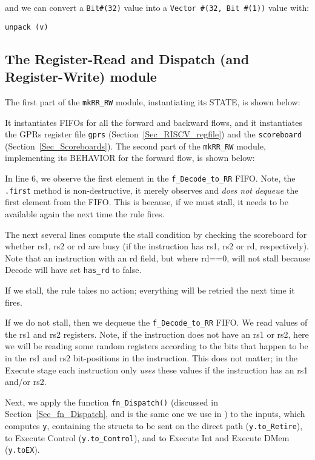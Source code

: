 and we can convert a \verb|Bit#(32)| value into a \verb|Vector #(32, Bit #(1))| value with:

\hmm \verb|unpack (v)|


\subsection{The Register-Read and Dispatch (and Register-Write) module}

\label{Sec_mkRR_RW}

The first part of the \verb|mkRR_RW| module, instantiating its STATE, is shown below:


It instantiates FIFOs for all the forward and backward flows, and it
instantiates the GPRs register file \verb|gprs|
(Section~\ref{Sec_RISCV_regfile}) and the \verb|scoreboard|
(Section~\ref{Sec_Scoreboards}).  The second part of the
\verb|mkRR_RW| module, implementing its BEHAVIOR for the forward flow,
is shown below:


In line 6, we observe the first element in the \verb|f_Decode_to_RR|
FIFO.  Note, the \verb|.first| method is non-destructive, {\ie} it
merely observes and \emph{does not dequeue} the first element from the
FIFO.  This is because, if we must stall, it needs to be available
again the next time the rule fires.

The next several lines compute the stall condition by checking the
scoreboard for whether rs1, rs2 or rd are busy (if the instruction has
rs1, rs2 or rd, respectively).  Note that an instruction with an rd
field, but where rd==0, will not stall because Decode will have set
\verb|has_rd| to false.

If we stall, the rule takes no action; everything will be retried the
next time it fires.

If we do not stall, then we dequeue the \verb|f_Decode_to_RR| FIFO.
We read values of the rs1 and rs2 registers.  Note, if the instruction
does not have an rs1 or rs2, here we will be reading some random
registers according to the bits that happen to be in the rs1 and rs2
bit-positions in the instruction.  This does not matter; in the
Execute stage each instruction only \emph{uses} these values if the
instruction has an rs1 and/or rs2.

Next, we apply the function \verb|fn_Dispatch()| (discussed in
Section~\ref{Sec_fn_Dispatch}, and is the same one we use in {\DRUM}) to
the inputs, which computes \verb|y|, containing the structs to be sent
on the direct path (\verb|y.to_Retire|), to Execute Control
(\verb|y.to_Control|), and to Execute Int and Execute DMem
(\verb|y.toEX|).

